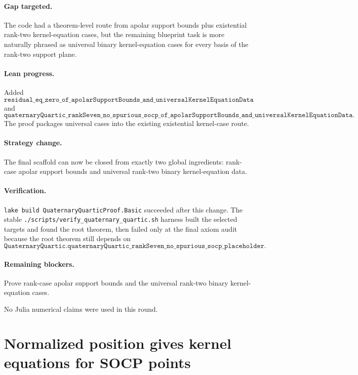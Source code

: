 \documentclass[11pt]{article}
\begin{document}
\paragraph{Gap targeted.}
The code had a theorem-level route from apolar support bounds plus existential
rank-two kernel-equation cases, but the remaining blueprint task is more
naturally phrased as universal binary kernel-equation cases for every basis of
the rank-two support plane.

\paragraph{Lean progress.}
Added
\[
\texttt{residual\_eq\_zero\_of\_apolarSupportBounds\_and\_universalKernelEquationData}
\]
and
\[
\texttt{quaternaryQuartic\_rankSeven\_no\_spurious\_socp\_of\_apolarSupportBounds\_and\_universalKernelEquationData}.
\]
The proof packages universal cases into the existing existential kernel-case
route.

\paragraph{Strategy change.}
The final scaffold can now be closed from exactly two global ingredients:
rank-case apolar support bounds and universal rank-two binary kernel-equation
data.

\paragraph{Verification.}
\texttt{lake build QuaternaryQuarticProof.Basic} succeeded after this change.
The stable \texttt{./scripts/verify\_quaternary\_quartic.sh} harness built the
selected targets and found the root theorem, then failed only at the final axiom
audit because the root theorem still depends on
\[
\texttt{QuaternaryQuartic.quaternaryQuartic\_rankSeven\_no\_spurious\_socp\_placeholder}.
\]

\paragraph{Remaining blockers.}
Prove rank-case apolar support bounds and the universal rank-two binary
kernel-equation cases.

No Julia numerical claims were used in this round.

\section*{Normalized position gives kernel equations for SOCP points}
\end{document}

